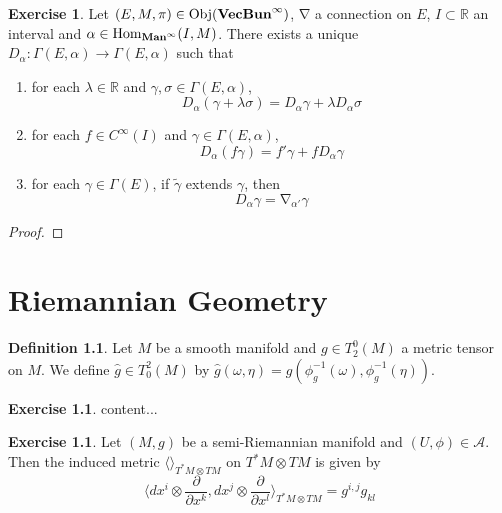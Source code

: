 \documentclass{book}
\theoremstyle{definition}
\newtheorem{defn}[definition]{Definition}
\newtheorem{ex}[definition]{Exercise}
\newcommand{\al}{\alpha}
\newcommand{\gam}{\gamma}
\newcommand{\lam}{\lambda}
\newcommand{\sig}{\sigma}
\newcommand{\om}{\omega}
\newcommand{\Gam}{\Gamma}
\newcommand{\R}{\mathbb{R}}
\newcommand{\MA}{\mathcal{A}}
\DeclareMathOperator{\Obj}{Obj}
\DeclareMathOperator{\Hom}{Hom}
\DeclareMathOperator{\nab}{\nabla}
\DeclareMathOperator*{\Maninf}{\text{\tbf{Man}}^{\infty}}
\DeclareMathOperator*{\VecBuninf}{\text{\tbf{VecBun}}^{\infty}}
\DeclareMathOperator*{\0}{\mbf{0}}
\DeclareMathOperator*{\1}{\mbf{1}}
\renewcommand{\r}{\rangle}
\renewcommand{\l}{\langle}
\newcommand{\tbf}[1]{\textbf{#1}}
\newcommand{\p}{\partial}
\begin{document}
	\begin{ex}
		Let $(E, M, \pi) \in \Obj(\VecBuninf)$, $\nab$ a connection on $E$, $I \subset \R$ an interval and $\al \in \Hom_{\Maninf}(I, M)$. There exists a unique $D_{\al}: \Gam(E, \al) \rightarrow \Gam(E, \al)$ such that 
		\begin{enumerate}
			\item for each $\lam \in \R$ and $\gam, \sig \in \Gam(E, \al)$, 
			$$D_{\al}(\gam + \lam \sig) = D_{\al} \gam + \lam D_{\al} \sig $$
			\item for each $f \in C^{\infty}(I)$ and $\gam \in \Gam(E, \al)$, 
			$$D_{\al}(f \gam) = f' \gam + f D_{\al} \gam $$
			\item for each $\gam \in \Gam(E)$, if $\tilde{\gam}$ extends $\gam$, then 
			$$D_{\al} \gam = \nab_{\al'} \gam$$
		\end{enumerate}
	\end{ex}

	\begin{proof}
		
	\end{proof}
	























	\newpage
	\chapter{Riemannian Geometry}

	\begin{defn}
		Let $M$ be a smooth manifold and $g \in T^0_2(M)$ a metric tensor on $M$. We define $\hat{g} \in T^2_0(M)$ by $\hat{g}(\om, \eta) = g(\phi_g^{-1}(\om), \phi_g^{-1}(\eta))$. 
	\end{defn}

	\begin{ex}
		content...
	\end{ex}

	\begin{ex}
		Let $(M, g)$ be a semi-Riemannian manifold and $(U, \phi) \in \MA$. Then the induced metric $\l \r_{T^*M \otimes TM}$ on $T^*M \otimes TM$ is given by 
		$$\bigg \l dx^i \otimes \frac{\p }{\p x^k}, dx^j \otimes \frac{\p}{\p x^l} \bigg \r_{T^*M \otimes TM} = g^{i,j}g_{kl}$$
	\end{ex}
\end{document}
